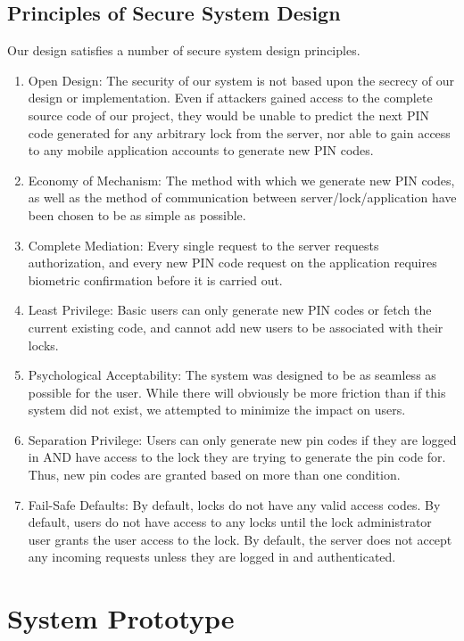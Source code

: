 \documentclass[conference]{IEEEtran}
\begin{document}
\subsection{Principles of Secure System Design}
Our design satisfies a number of secure system design principles.
\begin{enumerate}
\item{Open Design: The security of our system is not based upon the secrecy of our design or implementation. Even if attackers gained access to the complete source code of our project, they would be unable to predict the next PIN code generated for any arbitrary lock from the server, nor able to gain access to any mobile application accounts to generate new PIN codes.}
\item{
Economy of Mechanism: The method with which we generate new PIN codes, as well as the method of communication between server/lock/application have been chosen to be as simple as possible.
}
\item{
Complete Mediation: Every single request to the server requests authorization, and every new PIN code request on the application requires biometric confirmation before it is carried out.
}
\item{
Least Privilege: Basic users can only generate new PIN codes or fetch the current existing code, and cannot add new users to be associated with their locks.
}
\item{
Psychological Acceptability: The system was designed to be as seamless as possible for the user. While there will obviously be more friction than if this system did not exist, we attempted to minimize the impact on users.
}
\item{
Separation Privilege: Users can only generate new pin codes if they are logged in AND have access to the lock they are trying to generate the pin code for. Thus, new pin codes are granted based on more than one condition.
}
\item{
Fail-Safe Defaults: By default, locks do not have any valid access codes. By default, users do not have access to any locks until the lock administrator user grants the user access to the lock. By default, the server does not accept any incoming requests unless they are logged in and authenticated.
}
\end{enumerate}


\section{System Prototype}
\end{document}
